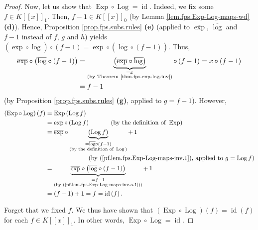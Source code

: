 \begin{proof}
Now, let us show that $\operatorname*{Exp}\circ\operatorname*{Log}%
=\operatorname*{id}$. Indeed, we fix some $f\in K\left[  \left[  x\right]
\right]  _{1}$. Then, $f-1\in K\left[  \left[  x\right]  \right]  _{0}$ (by
Lemma \ref{lem.fps.Exp-Log-maps-wd} \textbf{(d)}). Hence, Proposition
\ref{prop.fps.subs.rules} \textbf{(e)} (applied to $\overline{\exp}$,
$\overline{\log}$ and $f-1$ instead of $f$, $g$ and $h$) yields $\left(
\overline{\exp}\circ\overline{\log}\right)  \circ\left(  f-1\right)
=\overline{\exp}\circ\left(  \overline{\log}\circ\left(  f-1\right)  \right)
$. Thus,%
\begin{align}
\overline{\exp}\circ\left(  \overline{\log}\circ\left(  f-1\right)  \right)
&  =\underbrace{\left(  \overline{\exp}\circ\overline{\log}\right)
}_{\substack{=x\\\text{(by Theorem \ref{thm.fps.exp-log-inv})}}}\circ\left(
f-1\right)  =x\circ\left(  f-1\right) \nonumber\\
&  =f-1 \label{pf.lem.fps.Exp-Log-maps-inv.a.1}%
\end{align}
(by Proposition \ref{prop.fps.subs.rules} \textbf{(g)}, applied to $g=f-1$).
However,%
\begin{align*}
\left(  \operatorname*{Exp}\circ\operatorname*{Log}\right)  \left(  f\right)
&  =\operatorname*{Exp}\left(  \operatorname*{Log}f\right) \\
&  =\exp\circ\left(  \operatorname*{Log}f\right)  \ \ \ \ \ \ \ \ \ \ \left(
\text{by the definition of }\operatorname*{Exp}\right) \\
&  =\overline{\exp}\circ\underbrace{\left(  \operatorname*{Log}f\right)
}_{\substack{=\overline{\log}\circ\left(  f-1\right)  \\\text{(by the
definition of }\operatorname*{Log}\text{)}}}+\,1\\
&  \ \ \ \ \ \ \ \ \ \ \ \ \ \ \ \ \ \ \ \ \left(  \text{by
(\ref{pf.lem.fps.Exp-Log-maps-inv.1}), applied to }g=\operatorname*{Log}%
f\right) \\
&  =\underbrace{\overline{\exp}\circ\left(  \overline{\log}\circ\left(
f-1\right)  \right)  }_{\substack{=f-1\\\text{(by
(\ref{pf.lem.fps.Exp-Log-maps-inv.a.1}))}}}+\,1\\
&  =\left(  f-1\right)  +1=f=\operatorname*{id}\left(  f\right)  .
\end{align*}


Forget that we fixed $f$. We thus have shown that $\left(  \operatorname*{Exp}%
\circ\operatorname*{Log}\right)  \left(  f\right)  =\operatorname*{id}\left(
f\right)  $ for each $f\in K\left[  \left[  x\right]  \right]  _{1}$. In other
words, $\operatorname*{Exp}\circ\operatorname*{Log}=\operatorname*{id}$.


\end{proof}
